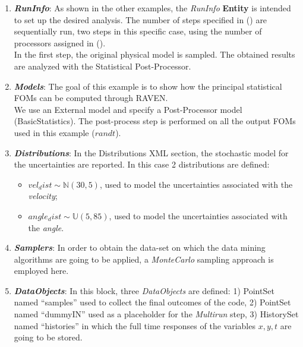 \begin{enumerate}
   \item \textbf{\textit{RunInfo}}:
   As shown in the other examples, the \textit{RunInfo} \textbf{Entity} is intended  to set up the desired analysis. The number of steps specified in () are sequentially run, two steps in this specific case, using the number of processors assigned in ().
   \\In the first step, the original physical model is sampled. The obtained results are  analyzed with the Statistical Post-Processor.
   \item \textbf{\textit{Models}}:
 The goal of this example is to show how the
 principal statistical FOMs can be computed through RAVEN.
 \\We use an External model and specify a Post-Processor model (BasicStatistics). The post-process step is performed on all the output FOMs used in this example ($r and t$).
   \item \textbf{\textit{Distributions}}:
  In the Distributions XML section, the stochastic model for the
  uncertainties are reported. In this case 2 distributions are defined:
  \begin{itemize}
    \item $vel_dist \sim \mathbb{N}(30,5)$, used to model the uncertainties
    associated with  the \textit{velocity};
    \item  $angle_dist \sim \mathbb{U}(5,85)$,  used to
    model the uncertainties associated with the \textit{angle}.
  \end{itemize}
   \item \textbf{\textit{Samplers}}:
  In order to obtain the data-set on which the data mining algorithms are going to be applied, a \textit{MonteCarlo} sampling approach is employed here.
   \item \textbf{\textit{DataObjects}}:
  In this block, three \textit{DataObjects} are defined:
  1) PointSet named ``samples'' used to collect the final outcomes of
  the code,
  2) PointSet named ``dummyIN'' used as a placeholder for the \textit{Multirun} step,
  3) HistorySet named ``histories'' in which the full time responses of the
  variables $x,y,t$ are going to be stored.


\end{enumerate}
